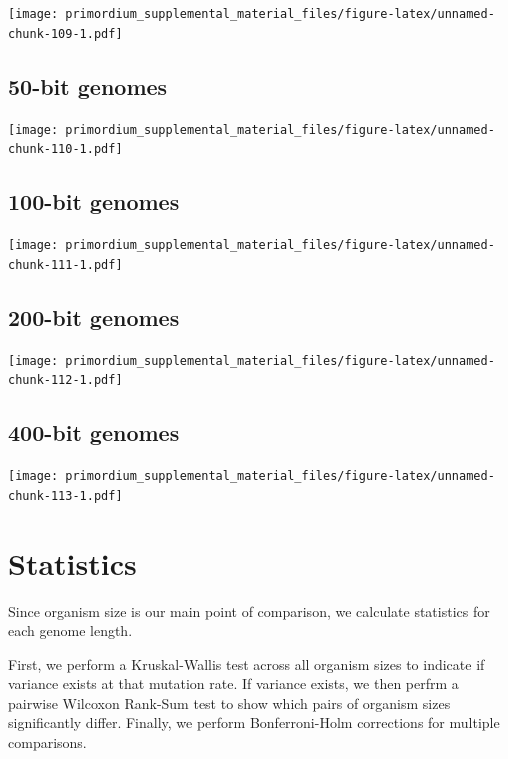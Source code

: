 \documentclass[]{book}
\begin{document}
\texttt{[image: primordium\_supplemental\_material\_files/figure-latex/unnamed-chunk-109-1.pdf]}

\hypertarget{bit-genomes-6}{%
\subsection{50-bit genomes}\label{bit-genomes-6}}

\texttt{[image: primordium\_supplemental\_material\_files/figure-latex/unnamed-chunk-110-1.pdf]}

\hypertarget{bit-genomes-7}{%
\subsection{100-bit genomes}\label{bit-genomes-7}}

\texttt{[image: primordium\_supplemental\_material\_files/figure-latex/unnamed-chunk-111-1.pdf]}

\hypertarget{bit-genomes-8}{%
\subsection{200-bit genomes}\label{bit-genomes-8}}

\texttt{[image: primordium\_supplemental\_material\_files/figure-latex/unnamed-chunk-112-1.pdf]}

\hypertarget{bit-genomes-9}{%
\subsection{400-bit genomes}\label{bit-genomes-9}}

\texttt{[image: primordium\_supplemental\_material\_files/figure-latex/unnamed-chunk-113-1.pdf]}

\hypertarget{statistics-6}{%
\section{Statistics}\label{statistics-6}}

Since organism size is our main point of comparison, we calculate statistics for each genome length.

First, we perform a Kruskal-Wallis test across all organism sizes to indicate if variance exists at that mutation rate.
If variance exists, we then perfrm a pairwise Wilcoxon Rank-Sum test to show which pairs of organism sizes significantly differ.
Finally, we perform Bonferroni-Holm corrections for multiple comparisons.
\end{document}
